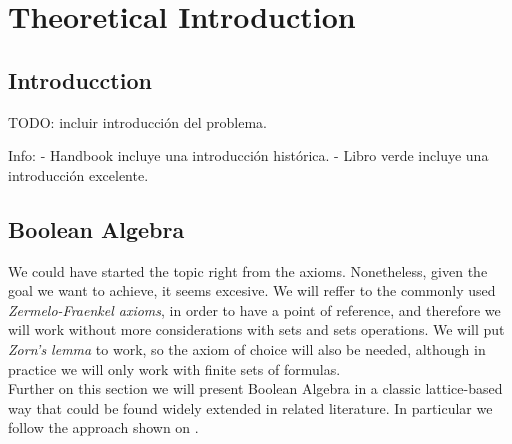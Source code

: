 
\chapter{Theoretical Introduction} %

\label{Chapter1} %


\newcommand{\keyword}[1]{\textbf{#1}}
\newcommand{\tabhead}[1]{\textbf{#1}}
\newcommand{\code}[1]{\texttt{#1}}
\newcommand{\file}[1]{\texttt{\bfseries#1}}
\newcommand{\option}[1]{\texttt{\itshape#1}}

\section{Introducction}

TODO: incluir introducción del problema.

Info:
- Handbook incluye una introducción histórica.
- Libro verde incluye una introducción excelente.



\section{Boolean Algebra}

We could have started the topic right from the axioms. Nonetheless, given the goal we want to achieve, it seems excesive. We will reffer to the commonly used \emph{Zermelo-Fraenkel axioms}, in order to have a point of reference, and therefore we will work without more considerations with sets and sets operations. We will put \emph{Zorn's lemma} to work, so the axiom of choice will also be needed, although in practice we will only work with finite sets of formulas.\\

Further on this section we will present Boolean Algebra in a classic lattice-based way that could be found widely extended in related literature. In particular we follow the approach shown on  \cite{marek2009introduction}.

